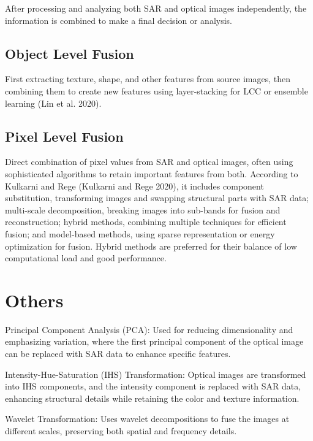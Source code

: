\documentclass[
  letterpaper,
  DIV=11,
  numbers=noendperiod]{scrreprt}
\begin{document}
After processing and analyzing both SAR and optical images
independently, the information is combined to make a final decision or
analysis.

\subsection{Object Level Fusion}\label{object-level-fusion}

First extracting texture, shape, and other features from source images,
then combining them to create new features using layer-stacking for LCC
or ensemble learning (Lin et al. 2020).

\subsection{Pixel Level Fusion}\label{pixel-level-fusion}

Direct combination of pixel values from SAR and optical images, often
using sophisticated algorithms to retain important features from both.
According to Kulkarni and Rege (Kulkarni and Rege 2020), it includes
component substitution, transforming images and swapping structural
parts with SAR data; multi-scale decomposition, breaking images into
sub-bands for fusion and reconstruction; hybrid methods, combining
multiple techniques for efficient fusion; and model-based methods, using
sparse representation or energy optimization for fusion. Hybrid methods
are preferred for their balance of low computational load and good
performance.

\section{Others}\label{others}

Principal Component Analysis (PCA): Used for reducing dimensionality and
emphasizing variation, where the first principal component of the
optical image can be replaced with SAR data to enhance specific
features.

Intensity-Hue-Saturation (IHS) Transformation: Optical images are
transformed into IHS components, and the intensity component is replaced
with SAR data, enhancing structural details while retaining the color
and texture information.

Wavelet Transformation: Uses wavelet decompositions to fuse the images
at different scales, preserving both spatial and frequency details.

\end{document}

